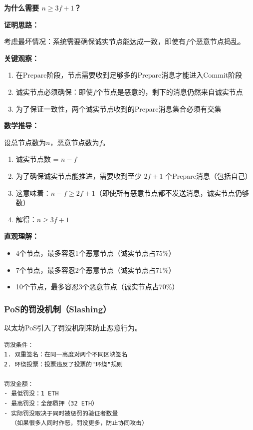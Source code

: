 ﻿\documentclass[12pt,a4paper]{article}
\begin{document}
\begin{theorybox}
\textbf{为什么需要 $n \geq 3f + 1$？}

\textbf{证明思路：}

考虑最坏情况：系统需要确保诚实节点能达成一致，即使有$f$个恶意节点捣乱。

\textbf{关键观察：}
\begin{enumerate}[leftmargin=1.5em]
\item 在Prepare阶段，节点需要收到足够多的Prepare消息才能进入Commit阶段
\item 诚实节点必须确保：即使$f$个节点是恶意的，剩下的消息仍然来自诚实节点
\item 为了保证一致性，两个诚实节点收到的Prepare消息集合必须有交集
\end{enumerate}

\textbf{数学推导：}

设总节点数为$n$，恶意节点数为$f$。

\begin{enumerate}[leftmargin=1.5em]
\item 诚实节点数 = $n - f$
\item 为了确保诚实节点能推进，需要收到至少 $2f + 1$ 个Prepare消息（包括自己）
\item 这意味着：$n - f \geq 2f + 1$（即使所有恶意节点都不发送消息，诚实节点仍够数）
\item 解得：$n \geq 3f + 1$
\end{enumerate}

\textbf{直观理解：}
\begin{itemize}[leftmargin=1.5em]
\item 4个节点，最多容忍1个恶意节点（诚实节点占75\%）
\item 7个节点，最多容忍2个恶意节点（诚实节点占71\%）
\item 10个节点，最多容忍3个恶意节点（诚实节点占70\%）
\end{itemize}
\end{theorybox}

\subsubsection{PoS的罚没机制（Slashing）}

以太坊PoS引入了罚没机制来防止恶意行为。

\begin{lstlisting}
罚没条件：
1. 双重签名：在同一高度对两个不同区块签名
2. 环绕投票：投票违反了投票的"环绕"规则

罚没金额：
- 最低罚没：1 ETH
- 最高罚没：全部质押（32 ETH）
- 实际罚没取决于同时被惩罚的验证者数量
  （如果很多人同时作恶，罚没更多，防止协同攻击）
\end{lstlisting}
\end{document}
